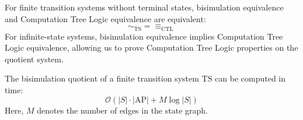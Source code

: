\noindent For finite transition systems without terminal states, bisimulation equivalence and Computation Tree Logic equivalence are equivalent:
\[\sim_{\text{TS}}=\equiv_{\text{CTL}}\]
\noindent For infinite-state systems, bisimulation equivalence implies Computation Tree Logic equivalence, allowing us to prove Computation Tree Logic properties on the quotient system.
\begin{theorem}
    The bisimulation quotient of a finite transition system $\text{TS}$ can be computed in time:
    \[\mathcal{O} \left(\left\lvert S\right\rvert \cdot \left\lvert \text{AP}\right\rvert  + M  \log \left\lvert S\right\rvert \right)\] 
    Here, $M$ denotes the number of edges in the state graph.
\end{theorem}